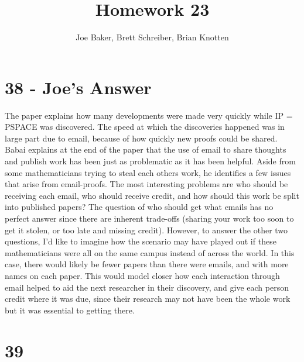 \documentclass[letterpaper,notitlepage,twoside]{article}
\begin{document}
\title{Homework 23}
\author{Joe Baker, Brett Schreiber, Brian Knotten}
\maketitle

\section*{38 - Joe's Answer}
The paper explains how many developments were made very quickly while IP = PSPACE was discovered. The speed at which the discoveries happened was in large part due to email, because of how quickly new proofs could be shared. Babai explains at the end of the paper that the use of email to share thoughts and publish work has been just as problematic as it has been helpful. Aside from some mathematicians trying to steal each others work, he identifies a few issues that arise from email-proofs. The most interesting problems are who should be receiving each email, who should receive credit, and how should this work be split into published papers? The question of who should get what emails has no perfect answer since there are inherent trade-offs (sharing your work too soon to get it stolen, or too late and missing credit). However, to answer the other two questions, I'd like to imagine how the scenario may have played out if these mathematicians were all on the same campus instead of across the world. In this case, there would likely be fewer papers than there were emails, and with more names on each paper. This would model closer how each interaction through email helped to aid the next researcher in their discovery, and give each person credit where it was due, since their research may not have been the whole work but it was essential to getting there.

\section*{39}
\end{document}
